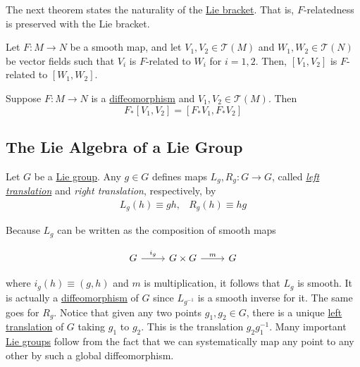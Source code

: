 \documentclass{article}
\newcounter{theorem}[section]
\newcounter{definition}[section]
\begin{document}
    The next theorem states the naturality of the \hyperref[def:lie-bracket]{Lie bracket}. That is, $F$-relatedness is preserved with the Lie bracket. 

    \begin{theorem}
      \label{thm:lie-brackets-respect-f-relatedness}
      Let $F: M \to N$ be a smooth map, and let $V_1, V_2 \in \mathcal{T} (M)$ and $W_1, W_2 \in \mathcal{T}(N)$ be vector fields such that $V_i$ is $F$-related to $W_i$ for $i = 1, 2$. Then, $[V_1, V_2]$ is $F$-related to $[W_1, W_2]$. 
    \end{theorem}

    \begin{corollary}
      \label{thm:diffeomorphisms-preserve-lie-brackets}
      Suppose $F: M \to N$ is a \hyperref[def:diffeomorphism-2]{diffeomorphism} and $V_1, V_2 \in \mathcal{T}(M)$. Then 
        \begin{equation}
          F_* [V_1, V_2] = [F_* V_1, F_* V_2]
        \end{equation}
    \end{corollary}

  \subsection{The Lie Algebra of a Lie Group}

    \begin{definition}
      \label{def:left-and-right-translation}
      Let $G$ be a \hyperref[def:lie-group]{Lie group}. Any $g \in G$ defines maps $L_g, R_g : G \to G$, called \textit{\hyperref[alg-def:left-translation]{left translation}} and \textit{right translation}, respectively, by 
      \begin{align*}
        L_g (h) \equiv g h , & R_g (h) \equiv h g
      \end{align*}
    \end{definition}

    Because $L_g$ can be written as the composition of smooth maps 

      \begin{equation}
        \begin{tikzcd}
              G \arrow{r}{i_g} & G \times G \arrow{r}{m} & G
              \end{tikzcd}
      \end{equation}

    where $i_g (h) \equiv (g, h)$ and $m$ is multiplication, it follows that $L_g$ is smooth. It is actually a \hyperref[def:diffeomorphism-2]{diffeomorphism} of $G$ since $L_{g^{-1}}$ is a smooth inverse for it. The same goes for $R_g$. Notice that given any two points $g_1, g_2 \in G$, there is a unique \hyperref[alg-def:left-translation]{left translation} of $G$ taking $g_1$ to $g_2$. This is the translation $g_2 g_1^{-1}$. Many important \hyperref[def:lie-group]{Lie groups} follow from the fact that we can systematically map any point to any other by such a global diffeomorphism. 
\end{document}
